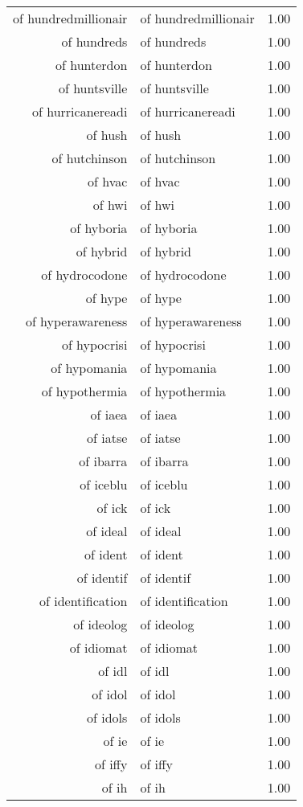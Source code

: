 \begin{table}[ht]
\begin{tabular}{rlr}
  of hundredmillionair & of hundredmillionair & 1.00 \\ 
  of hundreds & of hundreds & 1.00 \\ 
  of hunterdon & of hunterdon & 1.00 \\ 
  of huntsville & of huntsville & 1.00 \\ 
  of hurricanereadi & of hurricanereadi & 1.00 \\ 
  of hush & of hush & 1.00 \\ 
  of hutchinson & of hutchinson & 1.00 \\ 
  of hvac & of hvac & 1.00 \\ 
  of hwi & of hwi & 1.00 \\ 
  of hyboria & of hyboria & 1.00 \\ 
  of hybrid & of hybrid & 1.00 \\ 
  of hydrocodone & of hydrocodone & 1.00 \\ 
  of hype & of hype & 1.00 \\ 
  of hyperawareness & of hyperawareness & 1.00 \\ 
  of hypocrisi & of hypocrisi & 1.00 \\ 
  of hypomania & of hypomania & 1.00 \\ 
  of hypothermia & of hypothermia & 1.00 \\ 
  of iaea & of iaea & 1.00 \\ 
  of iatse & of iatse & 1.00 \\ 
  of ibarra & of ibarra & 1.00 \\ 
  of iceblu & of iceblu & 1.00 \\ 
  of ick & of ick & 1.00 \\ 
  of ideal & of ideal & 1.00 \\ 
  of ident & of ident & 1.00 \\ 
  of identif & of identif & 1.00 \\ 
  of identification & of identification & 1.00 \\ 
  of ideolog & of ideolog & 1.00 \\ 
  of idiomat & of idiomat & 1.00 \\ 
  of idl & of idl & 1.00 \\ 
  of idol & of idol & 1.00 \\ 
  of idols & of idols & 1.00 \\ 
  of ie & of ie & 1.00 \\ 
  of iffy & of iffy & 1.00 \\ 
  of ih & of ih & 1.00 \\ 

\end{tabular}
\end{table}
